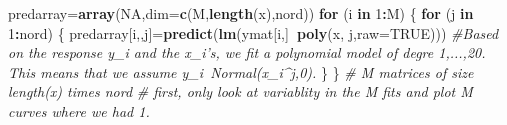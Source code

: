 \documentclass[]{article}
\newenvironment{Shaded}{\begin{snugshade}}{\end{snugshade}}
\newcommand{\KeywordTok}[1]{\textcolor[rgb]{0.13,0.29,0.53}{\textbf{#1}}}
\newcommand{\DataTypeTok}[1]{\textcolor[rgb]{0.13,0.29,0.53}{#1}}
\newcommand{\DecValTok}[1]{\textcolor[rgb]{0.00,0.00,0.81}{#1}}
\newcommand{\CommentTok}[1]{\textcolor[rgb]{0.56,0.35,0.01}{\textit{#1}}}
\newcommand{\OtherTok}[1]{\textcolor[rgb]{0.56,0.35,0.01}{#1}}
\newcommand{\ControlFlowTok}[1]{\textcolor[rgb]{0.13,0.29,0.53}{\textbf{#1}}}
\newcommand{\OperatorTok}[1]{\textcolor[rgb]{0.81,0.36,0.00}{\textbf{#1}}}
\newcommand{\NormalTok}[1]{#1}
\begin{document}
\begin{Shaded}
\begin{Highlighting}[]
\NormalTok{predarray=}\KeywordTok{array}\NormalTok{(}\OtherTok{NA}\NormalTok{,}\DataTypeTok{dim=}\KeywordTok{c}\NormalTok{(M,}\KeywordTok{length}\NormalTok{(x),nord))}
\ControlFlowTok{for}\NormalTok{ (i }\ControlFlowTok{in} \DecValTok{1}\OperatorTok{:}\NormalTok{M)}
\NormalTok{\{}
  \ControlFlowTok{for}\NormalTok{ (j }\ControlFlowTok{in} \DecValTok{1}\OperatorTok{:}\NormalTok{nord)}
\NormalTok{  \{}
\NormalTok{    predarray[i,,j]=}\KeywordTok{predict}\NormalTok{(}\KeywordTok{lm}\NormalTok{(ymat[i,]}\OperatorTok{~}\KeywordTok{poly}\NormalTok{(x, j,}\DataTypeTok{raw=}\OtherTok{TRUE}\NormalTok{)))}
    \CommentTok{#Based on the response y_i and the x_i's, we fit a polynomial model of degre 1,...,20. This means that we assume y_i~Normal(x_i^j,0). }
\NormalTok{  \}}
\NormalTok{\}}
\CommentTok{# M matrices of size length(x) times nord}
\CommentTok{# first, only look at variablity in the M fits and plot M curves where we had 1.}


\end{Highlighting}
\end{Shaded}
\end{document}
